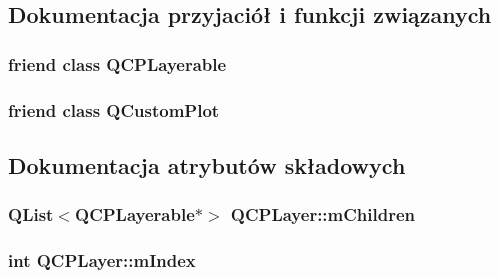 \subsection{Dokumentacja przyjaciół i funkcji związanych}
\subsubsection[{\texorpdfstring{Q\+C\+P\+Layerable}{QCPLayerable}}]{\setlength{\rightskip}{0pt plus 5cm}friend class {\bf Q\+C\+P\+Layerable}\hspace{0.3cm}{\ttfamily [friend]}}\hypertarget{class_q_c_p_layer_ad655f55cccf49ba14d5172ec517e07ae}{}\label{class_q_c_p_layer_ad655f55cccf49ba14d5172ec517e07ae}
\subsubsection[{\texorpdfstring{Q\+Custom\+Plot}{QCustomPlot}}]{\setlength{\rightskip}{0pt plus 5cm}friend class {\bf Q\+Custom\+Plot}\hspace{0.3cm}{\ttfamily [friend]}}\hypertarget{class_q_c_p_layer_a1cdf9df76adcfae45261690aa0ca2198}{}\label{class_q_c_p_layer_a1cdf9df76adcfae45261690aa0ca2198}


\subsection{Dokumentacja atrybutów składowych}
\subsubsection[{\texorpdfstring{m\+Children}{mChildren}}]{\setlength{\rightskip}{0pt plus 5cm}Q\+List$<${\bf Q\+C\+P\+Layerable}$\ast$$>$ Q\+C\+P\+Layer\+::m\+Children\hspace{0.3cm}{\ttfamily [protected]}}\hypertarget{class_q_c_p_layer_a704aa71bba469383c3a3c598c1ec0d28}{}\label{class_q_c_p_layer_a704aa71bba469383c3a3c598c1ec0d28}
\subsubsection[{\texorpdfstring{m\+Index}{mIndex}}]{\setlength{\rightskip}{0pt plus 5cm}int Q\+C\+P\+Layer\+::m\+Index\hspace{0.3cm}{\ttfamily [protected]}}\hypertarget{class_q_c_p_layer_a122088bcab6cec76a52b75ce8606605b}{}\label{class_q_c_p_layer_a122088bcab6cec76a52b75ce8606605b}
